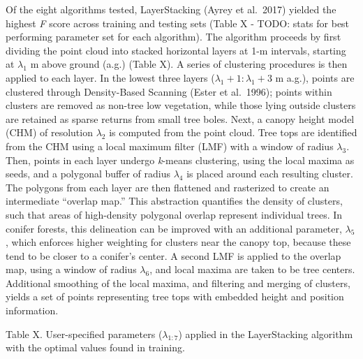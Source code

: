 \documentclass[
  12pt,
]{article}
\begin{document}
Of the eight algorithms tested, LayerStacking (Ayrey et al.~2017)
yielded the highest \emph{F} score across training and testing sets
(Table X - TODO: stats for best performing parameter set for each
algorithm). The algorithm proceeds by first dividing the point cloud
into stacked horizontal layers at 1-m intervals, starting at
\(\lambda_1\) m above ground (a.g.) (Table X). A series of clustering
procedures is then applied to each layer. In the lowest three layers
(\(\lambda_{1}+1 : \lambda_{1}+3\) m a.g.), points are clustered through
Density-Based Scanning (Ester et al.~1996); points within clusters are
removed as non-tree low vegetation, while those lying outside clusters
are retained as sparse returns from small tree boles. Next, a canopy
height model (CHM) of resolution \(\lambda_2\) is computed from the
point cloud. Tree tops are identified from the CHM using a local maximum
filter (LMF) with a window of radius \(\lambda_3\). Then, points in each
layer undergo \emph{k}-means clustering, using the local maxima as
seeds, and a polygonal buffer of radius \(\lambda_4\) is placed around
each resulting cluster. The polygons from each layer are then flattened
and rasterized to create an intermediate ``overlap map.'' This
abstraction quantifies the density of clusters, such that areas of
high-density polygonal overlap represent individual trees. In conifer
forests, this delineation can be improved with an additional parameter,
\(\lambda_5\), which enforces higher weighting for clusters near the
canopy top, because these tend to be closer to a conifer's center. A
second LMF is applied to the overlap map, using a window of radius
\(\lambda_6\), and local maxima are taken to be tree centers. Additional
smoothing of the local maxima, and filtering and merging of clusters,
yields a set of points representing tree tops with embedded height and
position information.

Table X. User-specified parameters (\(\lambda_{1:7}\)) applied in the
LayerStacking algorithm with the optimal values found in training.
\end{document}
